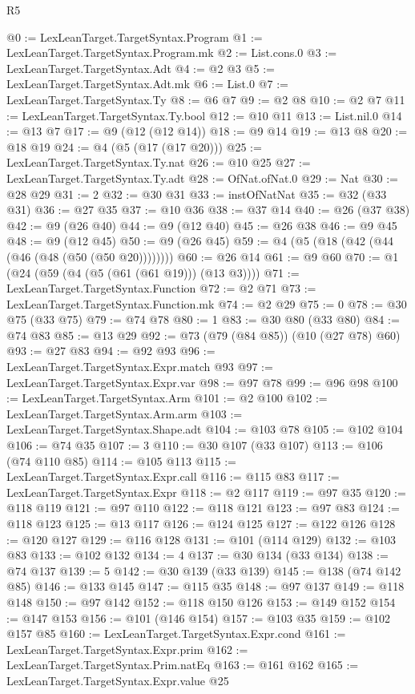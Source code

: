 \begin{lexlean}{R5}
\begin{coremodule}
@0 := LexLeanTarget.TargetSyntax.Program
@1 := LexLeanTarget.TargetSyntax.Program.mk
@2 := List.cons.{0}
@3 := LexLeanTarget.TargetSyntax.Adt
@4 := @2 @3
@5 := LexLeanTarget.TargetSyntax.Adt.mk
@6 := List.{0}
@7 := LexLeanTarget.TargetSyntax.Ty
@8 := @6 @7
@9 := @2 @8
@10 := @2 @7
@11 := LexLeanTarget.TargetSyntax.Ty.bool
@12 := @10 @11
@13 := List.nil.{0}
@14 := @13 @7
@17 := @9 (@12 (@12 @14))
@18 := @9 @14
@19 := @13 @8
@20 := @18 @19
@24 := @4 (@5 (@17 (@17 @20)))
@25 := LexLeanTarget.TargetSyntax.Ty.nat
@26 := @10 @25
@27 := LexLeanTarget.TargetSyntax.Ty.adt
@28 := OfNat.ofNat.{0}
@29 := Nat
@30 := @28 @29
@31 := 2
@32 := @30 @31
@33 := instOfNatNat
@35 := @32 (@33 @31)
@36 := @27 @35
@37 := @10 @36
@38 := @37 @14
@40 := @26 (@37 @38)
@42 := @9 (@26 @40)
@44 := @9 (@12 @40)
@45 := @26 @38
@46 := @9 @45
@48 := @9 (@12 @45)
@50 := @9 (@26 @45)
@59 := @4 (@5 (@18 (@42 (@44 (@46 (@48 (@50 (@50 @20))))))))
@60 := @26 @14
@61 := @9 @60
@70 := @1 (@24 (@59 (@4 (@5 (@61 (@61 @19))) (@13 @3))))
@71 := LexLeanTarget.TargetSyntax.Function
@72 := @2 @71
@73 := LexLeanTarget.TargetSyntax.Function.mk
@74 := @2 @29
@75 := 0
@78 := @30 @75 (@33 @75)
@79 := @74 @78
@80 := 1
@83 := @30 @80 (@33 @80)
@84 := @74 @83
@85 := @13 @29
@92 := @73 (@79 (@84 @85)) (@10 (@27 @78) @60)
@93 := @27 @83
@94 := @92 @93
@96 := LexLeanTarget.TargetSyntax.Expr.match @93
@97 := LexLeanTarget.TargetSyntax.Expr.var
@98 := @97 @78
@99 := @96 @98
@100 := LexLeanTarget.TargetSyntax.Arm
@101 := @2 @100
@102 := LexLeanTarget.TargetSyntax.Arm.arm
@103 := LexLeanTarget.TargetSyntax.Shape.adt
@104 := @103 @78
@105 := @102 @104
@106 := @74 @35
@107 := 3
@110 := @30 @107 (@33 @107)
@113 := @106 (@74 @110 @85)
@114 := @105 @113
@115 := LexLeanTarget.TargetSyntax.Expr.call
@116 := @115 @83
@117 := LexLeanTarget.TargetSyntax.Expr
@118 := @2 @117
@119 := @97 @35
@120 := @118 @119
@121 := @97 @110
@122 := @118 @121
@123 := @97 @83
@124 := @118 @123
@125 := @13 @117
@126 := @124 @125
@127 := @122 @126
@128 := @120 @127
@129 := @116 @128
@131 := @101 (@114 @129)
@132 := @103 @83
@133 := @102 @132
@134 := 4
@137 := @30 @134 (@33 @134)
@138 := @74 @137
@139 := 5
@142 := @30 @139 (@33 @139)
@145 := @138 (@74 @142 @85)
@146 := @133 @145
@147 := @115 @35
@148 := @97 @137
@149 := @118 @148
@150 := @97 @142
@152 := @118 @150 @126
@153 := @149 @152
@154 := @147 @153
@156 := @101 (@146 @154)
@157 := @103 @35
@159 := @102 @157 @85
@160 := LexLeanTarget.TargetSyntax.Expr.cond
@161 := LexLeanTarget.TargetSyntax.Expr.prim
@162 := LexLeanTarget.TargetSyntax.Prim.natEq
@163 := @161 @162
@165 := LexLeanTarget.TargetSyntax.Expr.value @25

\end{coremodule}
\end{lexlean}

